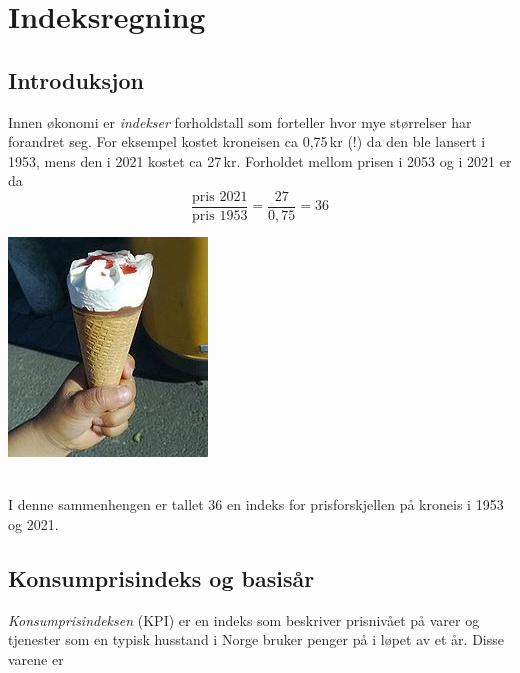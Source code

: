 




\newpage
\section{Indeksregning}
\subsection{Introduksjon}
\parbox{0.6\linewidth}{Innen økonomi er \textit{indekser} forholdstall som forteller hvor mye størrelser har forandret seg. For eksempel kostet kroneisen ca 0,75\,kr (!) da den ble lansert i 1953, mens den i 2021 kostet ca 27\,kr. Forholdet mellom prisen i 2053 og i 2021 er da
	\[ \frac{\text{pris 2021}}{\text{pris 1953}}=\frac{27}{0,75}= 36 \]
}
\parbox[r]{0.3\linewidth}{\includegraphics[scale=2]{kr}}\\[2pt]
I denne sammenhengen  er tallet 36 en indeks for prisforskjellen på kroneis i 1953 og 2021.

\subsection{Konsumprisindeks og basisår}
\textit{Konsumprisindeksen} (KPI) er en indeks som beskriver prisnivået på varer og tjenester som en typisk husstand i Norge bruker penger på i løpet av et år. Disse varene er \vs

